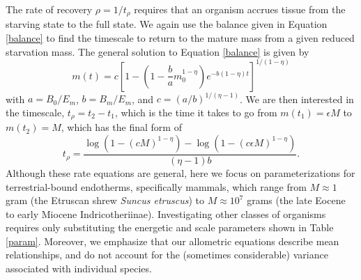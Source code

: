 \documentclass{pnastwo}
\begin{document}
\begin{article}

The rate of recovery $\rho = 1/t_\rho$ requires that an organism accrues tissue from the starving state to the full state.
We again use the balance given in Equation \ref{balance} to find the timescale to return to the mature mass from a given reduced starvation mass. The general solution to Equation \ref{balance} is given by
\begin{equation}
m\left(t\right)=c\left[1-\left(1-\frac{b}{a}m_{0}^{1-\eta}\right)e^{-b\left(1-\eta\right)t}\right]^{1/\left(1-\eta\right)}%
\end{equation}
with $a=B_{0}/E_{m}$, $b=B_{m}/E_{m}$, and $c=(a/b)^{1/(\eta-1)}$. We are then interested in the timescale, $t_{\rho}=t_{2}-t_{1}$, which is the time it takes to go from $m\left(t_{1}\right)=\epsilon M$ to $m\left(t_{2}\right)=M$, which has the final form of 
\begin{equation}
t_{\rho}=\frac{\log \left(1-\left(cM \right)^{1-\eta }\right)-\log \left(1-\left(c\epsilon M \right)^{1-\eta }\right)}{(\eta -1) b}.
\end{equation}
Although these rate equations are general, here we focus on parameterizations for terrestrial-bound endotherms, specifically mammals, which range from $M\approx1$ gram (the Etruscan shrew \emph{Suncus etruscus}) to $M\approx10^7$ grams (the late Eocene to early Miocene Indricotheriinae).
Investigating other classes of organisms requires only substituting the energetic and scale parameters shown in Table \ref{param}.
Moreover, we emphasize that our allometric equations describe mean relationships, and do not account for the (sometimes considerable) variance associated with individual species. 




\end{article}
\end{document}
